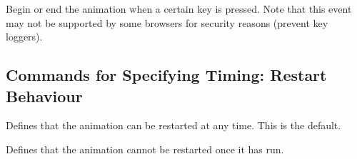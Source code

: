 \begin{command}{\pgfsysanimkeyaccesskey{}}
\end{command}
\begin{command}{\pgfsys@animation@accesskey{}}
    Begin or end the animation when a certain key is pressed. Note that this
    event may not be supported by some browsers for security reasons (prevent
    key loggers).
\begin{codeexample}[
    width=2cm,
    preamble={\usetikzlibrary{animations}},
]
\end{codeexample}
\end{command}


\subsection{Commands for Specifying Timing: Restart Behaviour}

\begin{command}{\pgfsysanimkeyrestartalways}
\end{command}
\begin{command}{\pgfsys@animation@restart@always}
    Defines that the animation can be restarted at any time. This is the
    default.
\begin{codeexample}[
    width=2cm,
    preamble={\usetikzlibrary{animations}},
]
\end{codeexample}
\end{command}

\begin{command}{\pgfsysanimkeyrestartnever}
\end{command}
\begin{command}{\pgfsys@animation@restart@never}
    Defines that the animation cannot be restarted once it has run.
\begin{codeexample}[
    width=2cm,
    preamble={\usetikzlibrary{animations}},
]
\end{codeexample}
\end{command}

